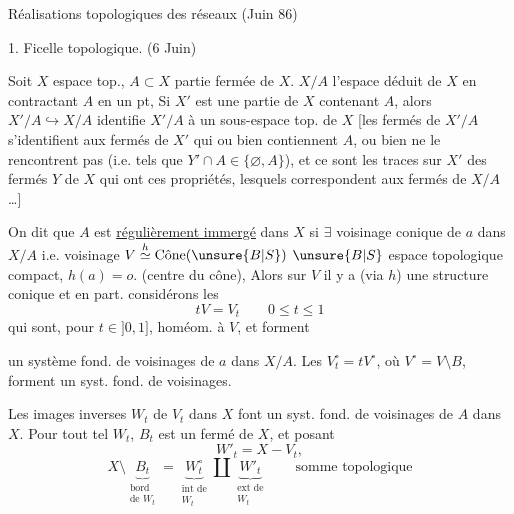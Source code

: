 Réalisations topologiques des réseaux \hfill (Juin 86)


1. Ficelle topologique. (6 Juin)

Soit $X$ espace top., $A\subset X$ partie fermée  de $X$.
 $X/A$ l'espace déduit de $X$ en contractant $A$ en un pt,
Si $X'$ est une partie de $X$ contenant $A$, alors $X'/A\hookrightarrow X/A$ identifie $X'/A$ à un sous-espace top. de $X$
[les fermés de $X'/A$ s'identifient aux fermés   de $X'$ qui ou bien contiennent $A$, ou bien ne le rencontrent pas (i.e. tels que $Y'\cap A\in\{\varnothing,A\}$), et ce sont les traces sur $X'$ des fermés $Y$ de $X$ qui ont ces  propriétés, lesquels correspondent  aux fermés de $X/A$ \ldots]

On dit que $A$ est \uline{régulièrement immergé} dans $X$
si $\exists$ voisinage  conique de $a$ dans $X/A$
i.e. voisinage 
$V\overset{h}{\simeq}\operatorname{\text{Cône}}(\unsure{B|S})$
$\unsure{B|S}$ espace topologique compact, $h(a)=o$.
(centre du cône),
 Alors  sur $V$ il y a (via $h$) une structure conique et en part. considérons les
\[
tV=V_t\qquad 0\le t\le1
\]
qui sont, pour $t\in]0,1]$, homéom. à $V$, et forment




un système fond. de voisinages de $a$ dans $X/A$.
Les $V_t^\circ=tV^\circ$, où $V^\circ=V\setminus B$,
forment un syst. fond. de voisinages.


Les images inverses $W_t$ de $V_t$ dans $X$ font un syst. fond. de voisinages de $A$ dans $X$.
 Pour tout tel $W_t$,  $B_t$
 est
un fermé de $X$, et posant 
\[
W'_t=X-V_t,
\]
\[
X\setminus\underbrace{B_t}_{\substack{\text{bord}\\\text{de }W_t}}
=
\underbrace{W_t^\circ}_{\substack{\text{int de}\\W_t}}
\amalg
\underbrace{W'_t}_{\substack{\text{ext de}\\W_t}}
\qquad\text{somme topologique}
\]

